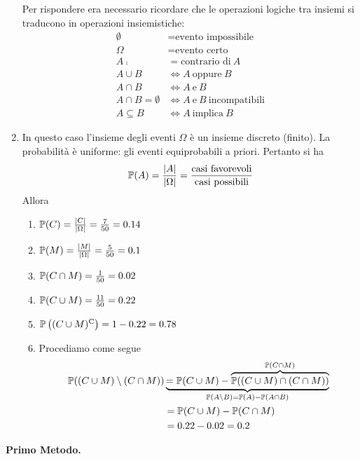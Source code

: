 \begin{enumerate}
	Per rispondere era necessario ricordare che le operazioni logiche tra insiemi si traducono in operazioni insiemistiche:
	\begin{align*}
		\emptyset  & =\text{evento impossibile}\\
		\Omega  & =\text{evento certo}\\
		A\comp & =\text{contrario di} \ A\\
		A\cup B & \iff A\ \text{oppure} \ B\\
		A\cap B & \iff A\ \text{e} \ B\\
		A\cap B=\emptyset  & \iff A\ \text{e} \ B\ \text{incompatibili}\\
		A\subseteq B & \iff A\ \text{implica} \ B
	\end{align*}
	\item In questo caso l'insieme degli eventi $\Omega $ è un insieme discreto (finito). La probabilità è uniforme: gli eventi equiprobabili a priori. Pertanto si ha
	\begin{equation*}
		\mathbb{P}(A) =\frac{| A| }{| \Omega | } =\frac{\text{casi favorevoli}}{\text{casi possibili}}
	\end{equation*}
	Allora
	\begin{enumerate}
		\item $\mathbb{P}(C) =\frac{| C| }{| \Omega | } =\frac{7}{50} =0.14$
		\item $\mathbb{P}(M) =\frac{| M| }{| \Omega | } =\frac{5}{50} =0.1$
		\item $\mathbb{P}(C\cap M) =\frac{1}{50} =0.02$
		\item $\mathbb{P}(C\cup M) =\frac{11}{50} =0.22$
		\item $\mathbb{P}\left((C\cup M)^{\mathrm{C}}\right) =1-0.22=0.78$
		\item Procediamo come segue
		\begin{align*}
			\mathbb{P}((C\cup M) \setminus (C\cap M)) & \underbrace{=\mathbb{P}(C\cup M) -\overbrace{\mathbb{P}((C\cup M) \cap (C\cap M))}^{\mathbb{P}(C\cap M)}}_{\mathbb{P}(A\setminus B) =\mathbb{P}(A) -\mathbb{P}(A\cap B)}\\
			 & =\mathbb{P}(C\cup M) -\mathbb{P}(C\cap M)\\
			 & =0.22-0.02=0.2
		\end{align*}
	\end{enumerate}
\end{enumerate}

\Soluzione

\textbf{Primo Metodo.}

